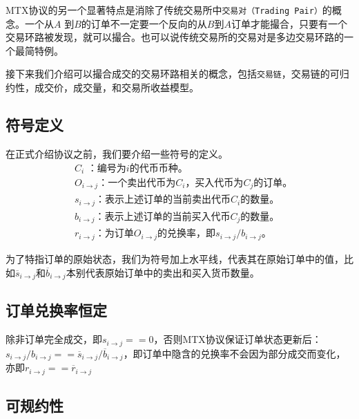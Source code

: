 \documentclass[UTF8,nofonts]{ctexart}
\begin{document}
MTX协议的另一个显著特点是消除了传统交易所中\texttt{交易对（Trading Pair）}的概念。一个从$A$ 到$B$的订单不一定要一个反向的从$B$到$A$订单才能撮合，只要有一个交易环路被发现，就可以撮合。也可以说传统交易所的交易对是多边交易环路的一个最简特例。

接下来我们介绍可以撮合成交的交易环路相关的概念，包括\texttt{交易链}，交易链的可归约性，成交价，成交量，和交易所收益模型。

\subsection{符号定义}

在正式介绍协议之前，我们要介绍一些符号的定义。
\[
\begin{split}
&C_{i}\text{ ：}\text{编号为$i$的代币币种。}\\
&O_{i\rightarrow j}\text{：}\text{一个卖出代币为$C_{i}$，买入代币为$C_{j}$的订单。}\\
&s_{i\rightarrow j}\text{：}\text{表示上述订单的当前卖出代币$C_{i}$的数量。}\\
&b_{i\rightarrow j}\text{：}\text{表示上述订单的当前买入代币$C_{j}$的数量。}\\
&r_{i\rightarrow j}\text{：}\text{为订单$O_{i\rightarrow j}$的兑换率，即$s_{i\rightarrow j}/b_{i\rightarrow j}$。}
\end{split}
\]


为了特指订单的原始状态，我们为符号加上水平线，代表其在原始订单中的值，比如$\overline{s}_{i\rightarrow j}$和$\overline{b}_{i\rightarrow j}$本别代表原始订单中的卖出和买入货币数量。

\subsection{订单兑换率恒定\label{sec:consistrate}}

除非订单完全成交，即$s_{i\rightarrow j} == 0$，否则MTX协议保证订单状态更新后：
$s_{i\rightarrow j}/b_{i\rightarrow j} == \overline{s}_{i\rightarrow j}/\overline{b}_{i\rightarrow j}$，即订单中隐含的兑换率不会因为部分成交而变化，亦即$r_{i\rightarrow j} == \overline{r}_{i\rightarrow j}$

\subsection{可规约性\label{sec:reducability}}
\end{document}
